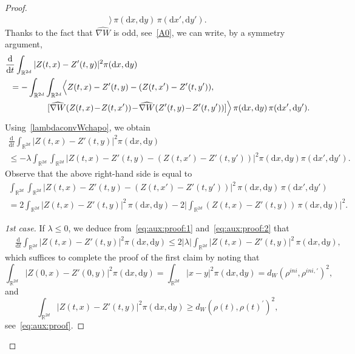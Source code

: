 \documentclass[11pt]{article}
\theoremstyle{definition}
\numberwithin{equation}{section}
\newcommand*{\dd}{\mathrm{d}}
\newcommand*{\dt}{\dd t}
\newcommand*{\dx}{\dd x}
\newcommand*{\dy}{\dd y}
\newcommand*\RR{\mathbb{R}}
\newenvironment{step}[1]{\begin{proof}[#1]}{\let\qed\relax \end{proof}}
\begin{document}
\begin{proof}
\begin{equation*}
\begin{split}
\Bigr\rangle \, \pi(\dx,\dy) \, \pi(\dx',\dy').
\end{split}
\end{equation*}
Thanks to the fact that $\widehat{\nabla W}$ is odd, see~\eqref{A0}, we can write, by a symmetry argument,
\begin{equation*}
\begin{split}
&\frac{\dd}{\dt} \int_{\RR^{2d}} \vert Z(t,x) - Z'(t,y) \vert^2
\pi(\dx,\dy)
\\
&\;\; =-
\int_{\RR^{2d}}
\int_{\RR^{2d}}
\Bigl\langle Z(t,x) - Z'(t,y)- (Z(t,x') - Z'(t,y')
),
\\
&\qquad\qquad\quad
[
\widehat{\nabla W}(Z(t,x) \!-\! Z(t,x') ) \!-\!
\widehat{\nabla W}(Z'(t,y) \!-\! Z'(t,y') ) ]
\Bigr\rangle \, \pi(\dx,\dy) \, \pi(\dx',\dy').
\end{split}
\end{equation*}
Using~\eqref{lambdaconvWchapo}, we obtain
\begin{multline}\label{eq:aux:proof:1}
\frac{\dd}{\dt} \int_{\RR^{2d}}\vert Z(t,x) - Z'(t,y) \vert^2
\pi(\dx,\dy)
\\
\leq - \lambda
\int_{\RR^{2d}}
\int_{\RR^{2d}}
\vert Z(t,x) \!-\! Z'(t,y)\!-\! (Z(t,x') \!-\! Z'(t,y')
)
\vert^2 \pi(\dx,\dy) \pi(\dx',\dy').\!
\end{multline}
Observe that the above right-hand side is equal to
\begin{multline}\label{eq:aux:proof:2}
\!\int_{\RR^{2d}}
\int_{\RR^{2d}}
\vert Z(t,x) - Z'(t,y)- (Z(t,x') - Z'(t,y')
)
\vert^2 \, \pi(\dx,\dy) \, \pi(\dx',\dy')
\\
= 2 \int_{\RR^{2d}}
\vert Z(t,x) \!-\! Z'(t,y)
\vert^2 \, \pi(\dx,\dy) - 2 \biggl\vert
\int_{\RR^{2d}}
(Z(t,x) \!-\! Z'(t,y)
)
\, \pi(\dx,\dy) \biggr\vert^2.\!
\end{multline}

\begin{step}{1st case}
If $\lambda \leq 0$, we deduce from~\eqref{eq:aux:proof:1} and~\eqref{eq:aux:proof:2} that
\begin{equation*}
\begin{split}
&\frac{\dd}{\dt} \int_{\RR^{2d}}\vert Z(t,x) - Z'(t,y) \vert^2
\pi(\dx,\dy)
\leq 2 \vert \lambda \vert
\int_{\RR^{2d}}
\vert Z(t,x) - Z'(t,y)
\vert^2 \, \pi(\dx,\dy),
\end{split}
\end{equation*}
which suffices to complete the proof of the first claim by noting that
\begin{equation*}
\int_{\RR^{2d}}\vert Z(0,x) - Z'(0,y) \vert^2
\pi(\dx,\dy) =
\int_{\RR^{2d}}\vert x - y \vert^2
\pi(\dx,\dy) = d_{W}(\rho^{ini},\rho^{ini,\prime})^2,
\end{equation*}
and
\begin{equation*}
\int_{\RR^{2d}}\vert Z(t,x) - Z'(t,y) \vert^2
\pi(\dx,\dy) \geq d_{W}(\rho(t),\rho(t)^{\prime})^2,
\end{equation*}
see~\eqref{eq:aux:proof}.
\end{step}


\end{proof}
\end{document}
